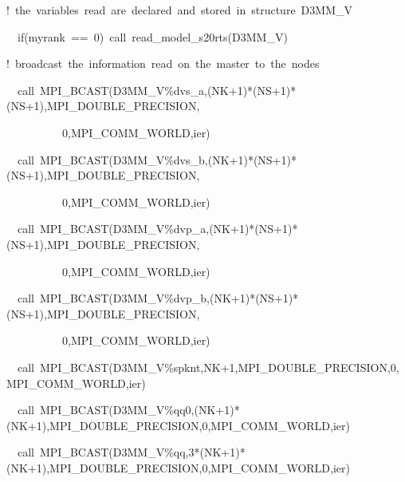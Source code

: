\documentclass[oneside,english]{book}
\newenvironment{lyxcode}
{\begin{list}{}{
\setlength{\rightmargin}{\leftmargin}
\setlength{\listparindent}{0pt}%
\raggedright
\setlength{\itemsep}{0pt}
\setlength{\parsep}{0pt}
\normalfont\ttfamily}%
 \item[]}
{\end{list}}
\begin{document}
\begin{lyxcode}
{\footnotesize !~the~variables~read~are~declared~and~stored~in~structure~D3MM\_V}{\footnotesize \par}

{\footnotesize{}~~if(myrank~==~0)~call~read\_model\_s20rts(D3MM\_V)~}{\footnotesize \par}

{\footnotesize !~broadcast~the~information~read~on~the~master~to~the~nodes~~~~~~~}{\footnotesize \par}

{\footnotesize{}~~call~MPI\_BCAST(D3MM\_V\%dvs\_a,(NK+1){*}(NS+1){*}(NS+1),MPI\_DOUBLE\_PRECISION,}{\footnotesize \par}

{\footnotesize{}~~~~~~~~~~0,MPI\_COMM\_WORLD,ier)}{\footnotesize \par}

{\footnotesize{}~~call~MPI\_BCAST(D3MM\_V\%dvs\_b,(NK+1){*}(NS+1){*}(NS+1),MPI\_DOUBLE\_PRECISION,}{\footnotesize \par}

{\footnotesize{}~~~~~~~~~~0,MPI\_COMM\_WORLD,ier)}{\footnotesize \par}

{\footnotesize{}~~call~MPI\_BCAST(D3MM\_V\%dvp\_a,(NK+1){*}(NS+1){*}(NS+1),MPI\_DOUBLE\_PRECISION,}{\footnotesize \par}

{\footnotesize{}~~~~~~~~~~0,MPI\_COMM\_WORLD,ier)}{\footnotesize \par}

{\footnotesize{}~~call~MPI\_BCAST(D3MM\_V\%dvp\_b,(NK+1){*}(NS+1){*}(NS+1),MPI\_DOUBLE\_PRECISION,}{\footnotesize \par}

{\footnotesize{}~~~~~~~~~~0,MPI\_COMM\_WORLD,ier)~~~~~~}{\footnotesize \par}

{\footnotesize{}~~call~MPI\_BCAST(D3MM\_V\%spknt,NK+1,MPI\_DOUBLE\_PRECISION,0,MPI\_COMM\_WORLD,ier)~~~~~~~}{\footnotesize \par}

{\footnotesize{}~~call~MPI\_BCAST(D3MM\_V\%qq0,(NK+1){*}(NK+1),MPI\_DOUBLE\_PRECISION,0,MPI\_COMM\_WORLD,ier)~}{\footnotesize \par}

{\footnotesize{}~~call~MPI\_BCAST(D3MM\_V\%qq,3{*}(NK+1){*}(NK+1),MPI\_DOUBLE\_PRECISION,0,MPI\_COMM\_WORLD,ier)~}{\footnotesize \par}
\end{lyxcode}
\end{document}
